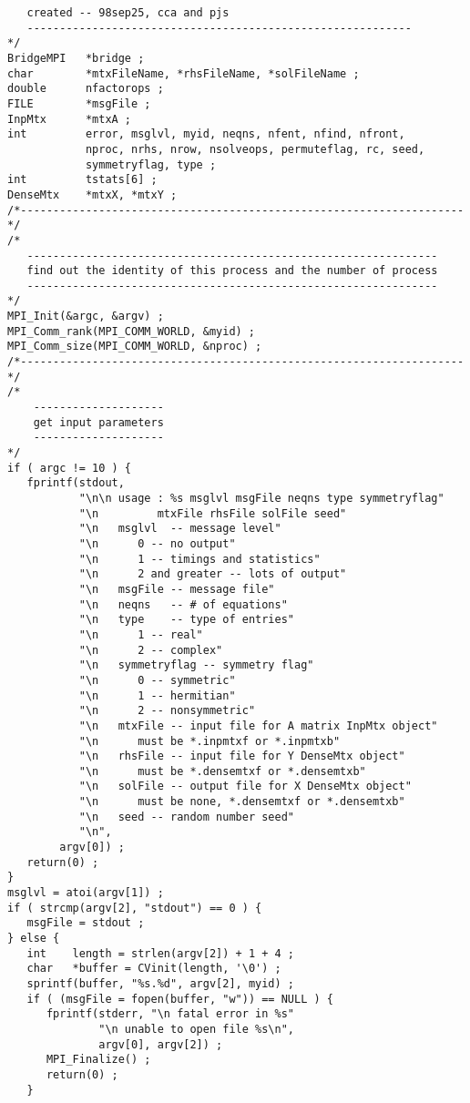 \begin{verbatim}
   created -- 98sep25, cca and pjs
   -----------------------------------------------------------
*/
BridgeMPI   *bridge ;
char        *mtxFileName, *rhsFileName, *solFileName ;
double      nfactorops ;
FILE        *msgFile ;
InpMtx      *mtxA ;
int         error, msglvl, myid, neqns, nfent, nfind, nfront,
            nproc, nrhs, nrow, nsolveops, permuteflag, rc, seed, 
            symmetryflag, type ;
int         tstats[6] ;
DenseMtx    *mtxX, *mtxY ;
/*--------------------------------------------------------------------*/
/*
   ---------------------------------------------------------------
   find out the identity of this process and the number of process
   ---------------------------------------------------------------
*/
MPI_Init(&argc, &argv) ;
MPI_Comm_rank(MPI_COMM_WORLD, &myid) ;
MPI_Comm_size(MPI_COMM_WORLD, &nproc) ;
/*--------------------------------------------------------------------*/
/*
    --------------------
    get input parameters
    --------------------
*/
if ( argc != 10 ) {
   fprintf(stdout, 
           "\n\n usage : %s msglvl msgFile neqns type symmetryflag"
           "\n         mtxFile rhsFile solFile seed"
           "\n   msglvl  -- message level"
           "\n      0 -- no output"
           "\n      1 -- timings and statistics"
           "\n      2 and greater -- lots of output"
           "\n   msgFile -- message file"
           "\n   neqns   -- # of equations"
           "\n   type    -- type of entries"
           "\n      1 -- real"
           "\n      2 -- complex"
           "\n   symmetryflag -- symmetry flag"
           "\n      0 -- symmetric"
           "\n      1 -- hermitian"
           "\n      2 -- nonsymmetric"
           "\n   mtxFile -- input file for A matrix InpMtx object"
           "\n      must be *.inpmtxf or *.inpmtxb"
           "\n   rhsFile -- input file for Y DenseMtx object"
           "\n      must be *.densemtxf or *.densemtxb"
           "\n   solFile -- output file for X DenseMtx object"
           "\n      must be none, *.densemtxf or *.densemtxb"
           "\n   seed -- random number seed"
           "\n",
        argv[0]) ;
   return(0) ;
}
msglvl = atoi(argv[1]) ;
if ( strcmp(argv[2], "stdout") == 0 ) {
   msgFile = stdout ;
} else {
   int    length = strlen(argv[2]) + 1 + 4 ;
   char   *buffer = CVinit(length, '\0') ;
   sprintf(buffer, "%s.%d", argv[2], myid) ;
   if ( (msgFile = fopen(buffer, "w")) == NULL ) {
      fprintf(stderr, "\n fatal error in %s"
              "\n unable to open file %s\n",
              argv[0], argv[2]) ;
      MPI_Finalize() ;
      return(0) ;
   }

\end{verbatim}
